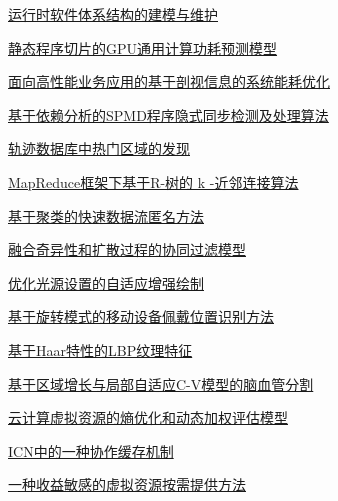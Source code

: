 \documentclass[a4paper]{article}
\begin{document}
\href{http://www.jos.org.cn/ch/reader/download_pdf.aspx?file_no=4360&year_id=2013&quarter_id=8&falg=1}{运行时软件体系结构的建模与维护}

\href{http://www.jos.org.cn/ch/reader/download_pdf.aspx?file_no=4361&year_id=2013&quarter_id=8&falg=1}{静态程序切片的GPU通用计算功耗预测模型}

\href{http://www.jos.org.cn/ch/reader/download_pdf.aspx?file_no=4363&year_id=2013&quarter_id=8&falg=1}{面向高性能业务应用的基于剖视信息的系统能耗优化}

\href{http://www.jos.org.cn/ch/reader/download_pdf.aspx?file_no=4343&year_id=2013&quarter_id=8&falg=1}{基于依赖分析的SPMD程序隐式同步检测及处理算法}

\href{http://www.jos.org.cn/ch/reader/download_pdf.aspx?file_no=4340&year_id=2013&quarter_id=8&falg=1}{轨迹数据库中热门区域的发现}

\href{http://www.jos.org.cn/ch/reader/download_pdf.aspx?file_no=4377&year_id=2013&quarter_id=8&falg=1}{MapReduce框架下基于R-树的 k -近邻连接算法}

\href{http://www.jos.org.cn/ch/reader/download_pdf.aspx?file_no=4330&year_id=2013&quarter_id=8&falg=1}{基于聚类的快速数据流匿名方法}

\href{http://www.jos.org.cn/ch/reader/download_pdf.aspx?file_no=4350&year_id=2013&quarter_id=8&falg=1}{融合奇异性和扩散过程的协同过滤模型}

\href{http://www.jos.org.cn/ch/reader/download_pdf.aspx?file_no=4348&year_id=2013&quarter_id=8&falg=1}{优化光源设置的自适应增强绘制}

\href{http://www.jos.org.cn/ch/reader/download_pdf.aspx?file_no=4409&year_id=2013&quarter_id=8&falg=1}{基于旋转模式的移动设备佩戴位置识别方法}

\href{http://www.jos.org.cn/ch/reader/download_pdf.aspx?file_no=4277&year_id=2013&quarter_id=8&falg=1}{基于Haar特性的LBP纹理特征}

\href{http://www.jos.org.cn/ch/reader/download_pdf.aspx?file_no=4394&year_id=2013&quarter_id=8&falg=1}{基于区域增长与局部自适应C-V模型的脑血管分割}

\href{http://www.jos.org.cn/ch/reader/download_pdf.aspx?file_no=4364&year_id=2013&quarter_id=8&falg=1}{云计算虚拟资源的熵优化和动态加权评估模型}

\href{http://www.jos.org.cn/ch/reader/download_pdf.aspx?file_no=4378&year_id=2013&quarter_id=8&falg=1}{ICN中的一种协作缓存机制}

\href{http://www.jos.org.cn/ch/reader/download_pdf.aspx?file_no=4388&year_id=2013&quarter_id=8&falg=1}{一种收益敏感的虚拟资源按需提供方法}
\end{document}
